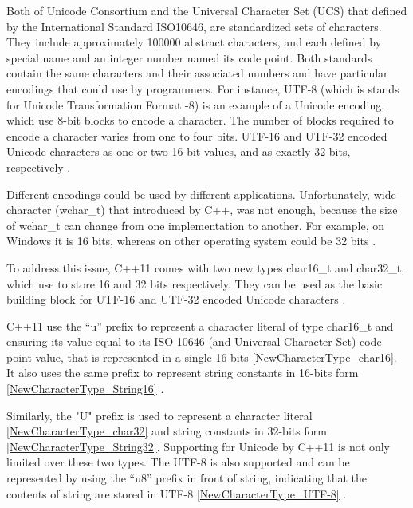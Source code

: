 \documentclass[11pt]{report}
\begin{document}
Both of Unicode Consortium and the Universal Character Set (UCS) that defined by the International Standard ISO10646, are standardized sets of characters. They include approximately 100000 abstract characters, and each defined by special name and an integer number named its code point. Both standards contain the same characters and their associated numbers and have particular encodings that could use by programmers. For instance, UTF-8 (which is stands for Unicode Transformation Format -8) is an example of a Unicode encoding, which use 8-bit blocks to encode a character. The number of blocks required to encode a character varies from one to four bits.  UTF-16 and UTF-32 encoded Unicode characters as one or two 16-bit values, and as exactly 32 bits, respectively \cite{Gregorie:professionalcpp}.
\newline

Different encodings could be used by different applications. Unfortunately, wide character (wchar\_t) that introduced by C++, was not enough, because the size of wchar\_t can change from one implementation to another. For example, on Windows it is 16 bits, whereas on other operating system could be 32 bits \cite{Gregorie:professionalcpp}. 
\newline

To address this issue, C++11 comes with two new types char16\_t and char32\_t, which use to store 16 and 32 bits respectively. They can be used as the basic building block for UTF-16 and UTF-32 encoded Unicode characters \cite{Josuttis:2012:CppStandardLibrary}.
\newline

C++11 use the “u” prefix to represent a character literal of type char16\_t and ensuring its value equal to its ISO 10646 (and Universal Character Set) code point value, that is represented in a single 16-bits \ref{NewCharacterType_char16}. It also uses the same prefix to represent string constants in 16-bits form \ref{NewCharacterType_String16} \cite{Josuttis2012:CppStandardLibrary}.
\newline

Similarly, the "U" prefix is used to represent a character literal \ref{NewCharacterType_char32} and string constants in 32-bits form \ref{NewCharacterType_String32}.  Supporting for Unicode by C++11 is not only limited over these two types. The UTF-8 is also supported and can be represented by using the “u8” prefix in front of string, indicating that the contents of string are stored in UTF-8 \ref{NewCharacterType_UTF-8} \cite{Josuttis:2012:CppStandardLibrary}.
\newline
\end{document}
